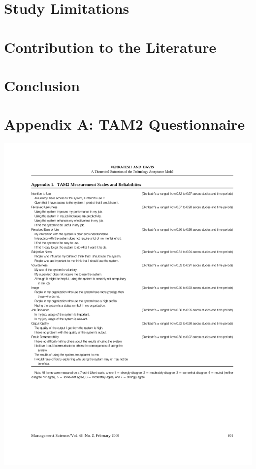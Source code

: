 \documentclass[12pt]{memoir}
\begin{document}
\chapter{Study Limitations}


\chapter{Contribution to the Literature}


\chapter{Conclusion}


\printglossary

\newpage



\appendix

\clearpage
\chapter{Appendix A: TAM2 Questionnaire}
\includegraphics[trim={25mm 60mm 10mm 0mm}]{pdf/TAM2.pdf}
\end{document}
